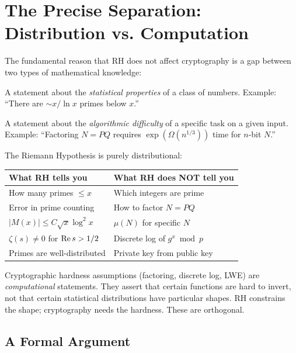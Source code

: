 \documentclass[11pt,a4paper]{article}
\begin{document}
\section{The Precise Separation: Distribution vs. Computation}
\label{sec:separation}

The fundamental reason that RH does not affect cryptography is a
gap between two types of mathematical knowledge:

\begin{definition}
A statement about the \emph{statistical properties} of a class of
numbers. Example: ``There are $\sim x/\ln x$ primes below $x$.''
\end{definition}

\begin{definition}
A statement about the \emph{algorithmic difficulty} of a specific
task on a given input. Example: ``Factoring $N = PQ$ requires
$\exp(\Omega(n^{1/3}))$ time for $n$-bit $N$.''
\end{definition}

The Riemann Hypothesis is purely distributional:

\begin{center}
\begin{tabular}{@{}ll@{}}
\toprule
\textbf{What RH tells you} & \textbf{What RH does NOT tell you} \\
\midrule
How many primes $\leq x$ & Which integers are prime \\
Error in prime counting & How to factor $N = PQ$ \\
$|M(x)| \leq C\sqrt{x}\log^2 x$ & $\mu(N)$ for specific $N$ \\
$\zeta(s) \neq 0$ for $\operatorname{Re} s > 1/2$ & Discrete log of $g^x \bmod p$ \\
Primes are well-distributed & Private key from public key \\
\bottomrule
\end{tabular}
\end{center}

Cryptographic hardness assumptions (factoring, discrete log, LWE)
are \emph{computational} statements. They assert that certain functions
are hard to invert, not that certain statistical distributions have
particular shapes. RH constrains the shape; cryptography needs the
hardness. These are orthogonal.

\subsection{A Formal Argument}
\end{document}

